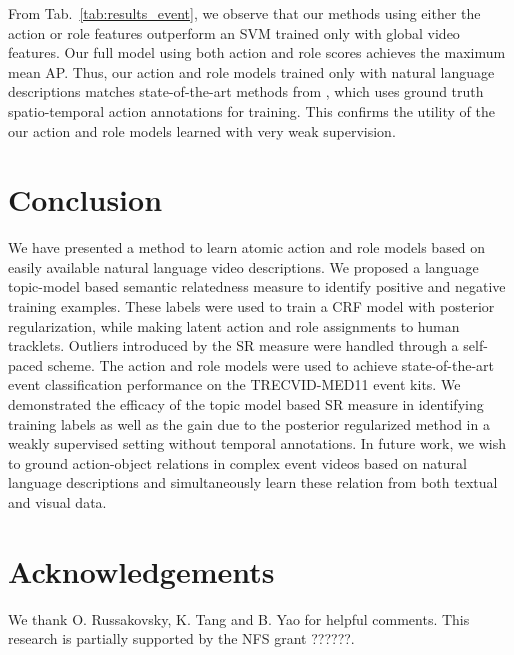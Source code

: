 \documentclass[10pt,twocolumn,letterpaper]{article}
\begin{document}
From Tab.~\ref{tab:results_event}, we observe that our methods using either the
action or role features outperform an SVM trained only with global video
features. Our full model using both action and role scores achieves the maximum
mean AP. Thus, our action and role models trained only with natural language
descriptions matches state-of-the-art methods from \cite{Izadinia_ECCV12},
which uses ground truth spatio-temporal action annotations for training. This
confirms the utility of the our action and role models learned with very weak
supervision.

\section{Conclusion}
We have presented a method to learn atomic action and role models based on easily available natural language video descriptions. We proposed a language topic-model based semantic relatedness measure to identify positive and negative training examples. These labels were used to train a CRF model with posterior regularization, while making latent action and role assignments to human tracklets. Outliers introduced by the SR measure were handled through a self-paced scheme. The action and role models were used to achieve state-of-the-art event classification performance on the TRECVID-MED11 event kits. We demonstrated the efficacy of the topic model based SR measure in identifying training labels as well as the gain due to the posterior regularized method in a weakly supervised setting without temporal annotations. In future work, we wish to ground action-object relations in complex event videos based on natural language descriptions and simultaneously learn these relation from both textual and visual data.

\section*{Acknowledgements}
We thank O. Russakovsky, K. Tang and B. Yao for helpful comments. This research is partially supported by the NFS grant ??????.


{\small


}
\end{document}
